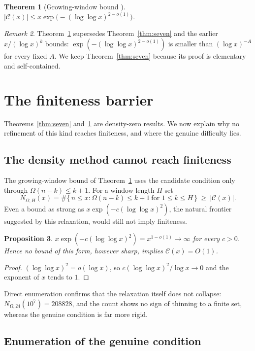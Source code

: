\documentclass[11pt]{article}
\newtheorem{theorem}{Theorem}[section]
\newtheorem{proposition}[theorem]{Proposition}
\theoremstyle{remark}
\newtheorem{remark}[theorem]{Remark}
\newcommand{\C}{\mathcal{C}}
\newcommand{\Om}{\Omega}
\begin{document}
\begin{theorem}[Growing-window bound \cite{HughesWindow}]\label{thm:t3}
$|\C(x)|\le x\exp\!\bigl(-(\log\log x)^{2-o(1)}\bigr)$.
\end{theorem}

\begin{remark}
Theorem~\ref{thm:t3} supersedes Theorem~\ref{thm:seven} and the earlier
$x/(\log x)^{k}$ bounds: $\exp(-(\log\log x)^{2-o(1)})$ is smaller than
$(\log x)^{-A}$ for every fixed $A$. We keep Theorem~\ref{thm:seven} because its
proof is elementary and self-contained.
\end{remark}

\section{The finiteness barrier}

Theorems~\ref{thm:seven} and~\ref{thm:t3} are density-zero results. We now explain
why no refinement of this kind reaches finiteness, and where the genuine difficulty
lies.

\subsection*{The density method cannot reach finiteness}

The growing-window bound of Theorem~\ref{thm:t3} uses the candidate condition only
through $\Om(n-k)\le k+1$. For a window length $H$ set
\[
  N_{\Om,H}(x)=\#\{\,n\le x: \Om(n-k)\le k+1\ \text{for }1\le k\le H\,\}\ \ge\ |\C(x)|.
\]
Even a bound as strong as
$x\exp(-c(\log\log x)^2)$, the natural frontier suggested by this relaxation, would
still not imply finiteness.

\begin{proposition}\label{prop:ceiling}
$x\exp(-c(\log\log x)^2)=x^{1-o(1)}\to\infty$ for every $c>0$. Hence no bound of this
form, however sharp, implies $\C(x)=O(1)$.
\end{proposition}

\begin{proof}
$(\log\log x)^2=o(\log x)$, so $c(\log\log x)^2/\log x\to0$ and the exponent of $x$
tends to $1$.
\end{proof}

Direct enumeration confirms that the relaxation itself does not collapse:
$N_{\Om,24}(10^7)=208828$, and the count shows no sign of thinning to a finite set,
whereas the genuine condition is far more rigid.

\subsection*{Enumeration of the genuine condition}
\end{document}
